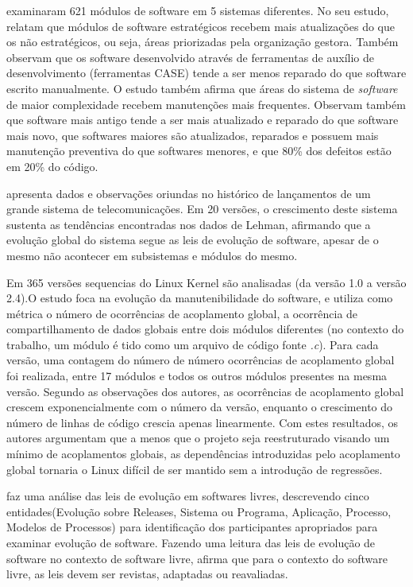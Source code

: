 \cite{kemerer1997determinants} examinaram 621 módulos de software em 5 sistemas diferentes. No seu estudo, relatam que módulos de software estratégicos recebem mais atualizações do que os não estratégicos, ou seja, áreas priorizadas pela organização gestora. Também observam que os software desenvolvido através de ferramentas de auxílio de desenvolvimento (ferramentas CASE) tende a ser menos reparado do que software escrito manualmente. O estudo também afirma que áreas do sistema de \textit{software} de maior complexidade  recebem manutenções mais frequentes. Observam também que software mais antigo tende a ser mais atualizado e reparado do que software mais novo, que softwares maiores são atualizados, reparados e possuem mais manutenção preventiva do que softwares menores, e que 80\% dos defeitos estão em 20\% do código.

\cite{gall1997software} apresenta dados e observações oriundas no histórico de lançamentos de um grande sistema de telecomunicações. Em 20 versões, o crescimento deste sistema sustenta as tendências encontradas nos dados de Lehman, afirmando que a evolução global do sistema segue as leis de evolução de software, apesar de o mesmo não acontecer em subsistemas e módulos do mesmo.

Em \cite{schach2002maintainability} 365 versões sequencias do Linux Kernel são analisadas (da versão 1.0 a versão 2.4).O estudo foca na evolução da manutenibilidade do software, e utiliza como métrica o número de ocorrências de acoplamento global, a ocorrência de compartilhamento de dados globais entre dois módulos diferentes (no contexto do trabalho, um módulo é tido como um arquivo de código fonte \textit{.c}).  Para cada versão, uma contagem do número de número ocorrências de acoplamento global foi realizada, entre 17 módulos e todos os outros módulos presentes na mesma versão. Segundo as observações dos autores, as ocorrências de acoplamento global crescem exponencialmente com o número da
versão, enquanto o crescimento do número de linhas de código
crescia apenas linearmente. Com estes resultados, os autores argumentam que
a menos que o projeto seja reestruturado visando um mínimo de acoplamentos globais, as
dependências introduzidas pelo acoplamento global tornaria o Linux difícil de ser mantido
sem a introdução de regressões.

\cite{scacchi2003understanding} faz uma análise das leis de evolução em softwares livres, descrevendo cinco entidades(Evolução sobre Releases, Sistema ou Programa, Aplicação, Processo, Modelos de Processos) para identificação dos participantes apropriados para examinar evolução de software. Fazendo uma leitura das leis de evolução de software no contexto de software livre, afirma que para o contexto do software livre, as leis devem ser revistas, adaptadas ou reavaliadas.


